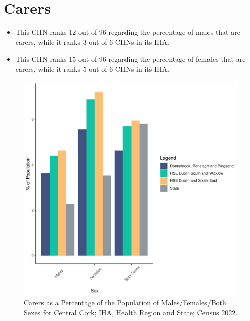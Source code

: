 \documentclass{article}
\begin{document}
\section{Carers}\label{sect:Carers}
\begin{itemize}
\item This CHN ranks  12 out of 96 regarding the percentage of males that are carers, while it ranks   3 out of 6 CHNs in its IHA.
\item This CHN ranks  15 out of 96 regarding the percentage of females that are carers, while it ranks   5 out of 6 CHNs in its IHA.
\end{itemize}
\begin{figure}[H]
	\centering
	\includegraphics[width = 150mm]{../figures/CareED.pdf}
	\caption{Carers as a Percentage of the Population of Males/Females/Both Sexes for Central Cork; IHA, Health Region and State; Census 2022.}
	\label{fig:2ae19629-1a6a-13a3-e055-000000000001}
	\end{figure}
\end{document}
